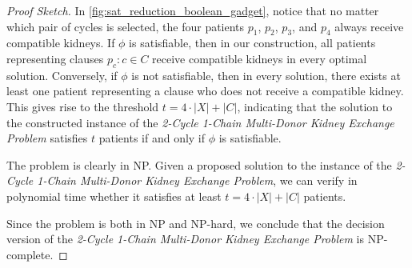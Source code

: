 \begin{proof}[Proof Sketch]
In \autoref{fig:sat_reduction_boolean_gadget}, notice that no matter which pair of cycles is selected, the four patients $p_1$, $p_2$, $p_3$, and $p_4$ always receive compatible kidneys. If $\phi$ is satisfiable, then in our construction, all patients representing clauses ${ p_c : c \in C }$ receive compatible kidneys in every optimal solution. Conversely, if $\phi$ is not satisfiable, then in every solution, there exists at least one patient representing a clause who does not receive a compatible kidney. This gives rise to the threshold $t = 4 \cdot |X| + |C|$, indicating that the solution to the constructed instance of the \textit{2-Cycle 1-Chain Multi-Donor Kidney Exchange Problem} satisfies $t$ patients if and only if $\phi$ is satisfiable.

The problem is clearly in NP. Given a proposed solution to the instance of the \textit{2-Cycle 1-Chain Multi-Donor Kidney Exchange Problem}, we can verify in polynomial time whether it satisfies at least $t = 4 \cdot |X| + |C|$ patients. 

Since the problem is both in NP and NP-hard, we conclude that the decision version of the \textit{2-Cycle 1-Chain Multi-Donor Kidney Exchange Problem} is NP-complete.
\end{proof}


